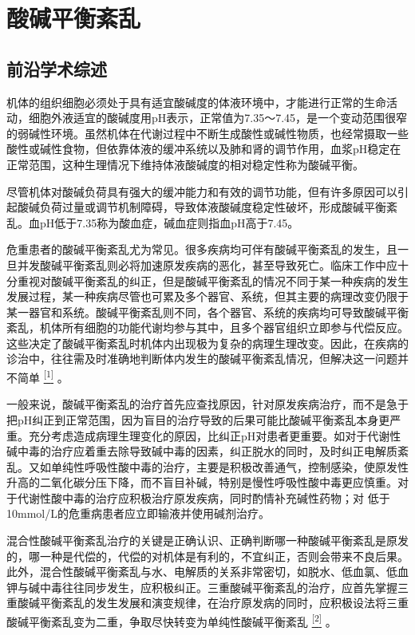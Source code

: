 \chapter{酸碱平衡紊乱}

\section{前沿学术综述}

机体的组织细胞必须处于具有适宜酸碱度的体液环境中，才能进行正常的生命活动，细胞外液适宜的酸碱度用pH表示，正常值为7.35～7.45，是一个变动范围很窄的弱碱性环境。虽然机体在代谢过程中不断生成酸性或碱性物质，也经常摄取一些酸性或碱性食物，但依靠体液的缓冲系统以及肺和肾的调节作用，血浆pH稳定在正常范围，这种生理情况下维持体液酸碱度的相对稳定性称为酸碱平衡。

尽管机体对酸碱负荷具有强大的缓冲能力和有效的调节功能，但有许多原因可以引起酸碱负荷过量或调节机制障碍，导致体液酸碱度稳定性破坏，形成酸碱平衡紊乱。血pH低于7.35称为酸血症，碱血症则指血pH高于7.45。

危重患者的酸碱平衡紊乱尤为常见。很多疾病均可伴有酸碱平衡紊乱的发生，且一旦并发酸碱平衡紊乱则必将加速原发疾病的恶化，甚至导致死亡。临床工作中应十分重视对酸碱平衡紊乱的纠正，但是酸碱平衡紊乱的情况不同于某一种疾病的发生发展过程，某一种疾病尽管也可累及多个器官、系统，但其主要的病理改变仍限于某一器官和系统。酸碱平衡紊乱则不同，各个器官、系统的疾病均可导致酸碱平衡紊乱，机体所有细胞的功能代谢均参与其中，且多个器官组织立即参与代偿反应。这些决定了酸碱平衡紊乱时机体内出现极为复杂的病理生理改变。因此，在疾病的诊治中，往往需及时准确地判断体内发生的酸碱平衡紊乱情况，但解决这一问题并不简单
\protect\hyperlink{text00026.htmlux5cux23ch1-25}{\textsuperscript{{[}1{]}}}
。

一般来说，酸碱平衡紊乱的治疗首先应查找原因，针对原发疾病治疗，而不是急于把pH纠正到正常范围，因为盲目的治疗导致的后果可能比酸碱平衡紊乱本身更严重。充分考虑造成病理生理变化的原因，比纠正pH对患者更重要。如对于代谢性碱中毒的治疗应着重去除导致碱中毒的因素，纠正脱水的同时，及时纠正电解质紊乱。又如单纯性呼吸性酸中毒的治疗，主要是积极改善通气，控制感染，使原发性升高的二氧化碳分压下降，而不盲目补碱，特别是慢性呼吸性酸中毒更应慎重。对于代谢性酸中毒的治疗应积极治疗原发疾病，同时酌情补充碱性药物；对
低于10mmol/L的危重病患者应立即输液并使用碱剂治疗。

混合性酸碱平衡紊乱治疗的关键是正确认识、正确判断哪一种酸碱平衡紊乱是原发的，哪一种是代偿的，代偿的对机体是有利的，不宜纠正，否则会带来不良后果。此外，混合性酸碱平衡紊乱与水、电解质的关系非常密切，如脱水、低血氯、低血钾与碱中毒往往同步发生，应积极纠正。三重酸碱平衡紊乱的治疗，应首先掌握三重酸碱平衡紊乱的发生发展和演变规律，在治疗原发病的同时，应积极设法将三重酸碱平衡紊乱变为二重，争取尽快转变为单纯性酸碱平衡紊乱
\protect\hyperlink{text00026.htmlux5cux23ch2-25}{\textsuperscript{{[}2{]}}}
。

